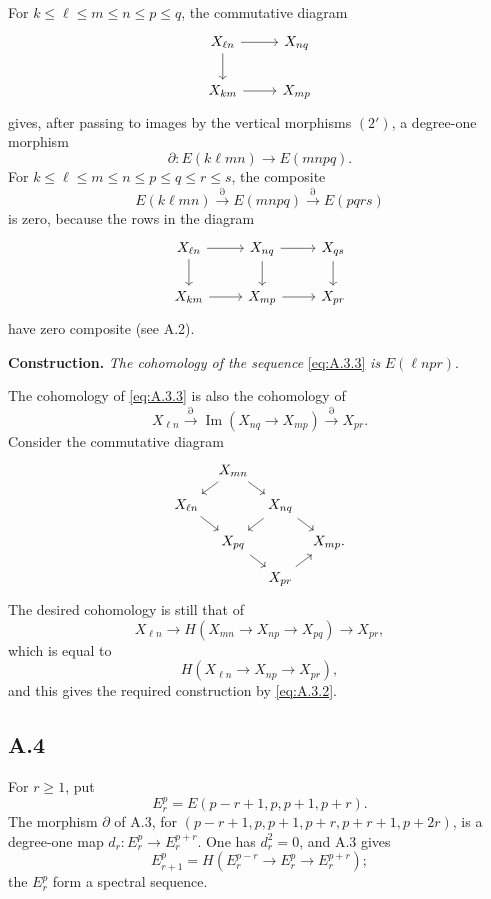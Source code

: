 \documentclass[11pt,a4paper]{article}
\theoremstyle{plain}
\theoremstyle{definition}
\theoremstyle{remark}
\begin{document}
For $k\leqslant \ell\leqslant m\leqslant n\leqslant p\leqslant q$, the commutative diagram
\[
\begin{tikzcd}
X_{\ell n} \arrow[r] \arrow[d] & X_{nq} \\
X_{km} \arrow[r] & X_{mp}
\end{tikzcd}
\]
gives, after passing to images by the vertical morphisms $(2')$, a degree-one morphism
\[
\partial\colon E(k\ell mn)\to E(mnpq).
\]
For $k\leqslant\ell\leqslant m\leqslant n\leqslant p\leqslant q\leqslant r\leqslant s$, the composite
\begin{equation}\label{eq:A.3.3}
E(k\ell mn)\xrightarrow{\partial}E(mnpq)\xrightarrow{\partial}E(pqrs)
\end{equation}
is zero, because the rows in the diagram
\[
\begin{tikzcd}
X_{\ell n} \arrow[r] \arrow[d] & X_{nq} \arrow[r] \arrow[d] & X_{qs} \arrow[d] \\
X_{km} \arrow[r] & X_{mp} \arrow[r] & X_{pr}
\end{tikzcd}
\]
have zero composite (see A.2).

\medskip
\noindent\textbf{Construction.} \emph{The cohomology of the sequence} \eqref{eq:A.3.3} \emph{is} $E(\ell npr)$.

The cohomology of \eqref{eq:A.3.3} is also the cohomology of
\[
X_{\ell n}\xrightarrow{\partial}\operatorname{Im}(X_{nq}\to X_{mp})\xrightarrow{\partial}X_{pr}.
\]
Consider the commutative diagram
\[
\begin{tikzcd}[column sep=tiny,row sep=small]
& X_{mn} \arrow[rd] \arrow[ld] \\
X_{\ell n} \arrow[rd] & & X_{nq} \arrow[ld] \arrow[rd] \\
& X_{pq} \arrow[rd] & & X_{mp}. \\
& & X_{pr} \arrow[ru]
\end{tikzcd}
\]
The desired cohomology is still that of
\[
X_{\ell n}\to H(X_{mn}\to X_{np}\to X_{pq})\to X_{pr},
\]
which is equal to
\[
H(X_{\ell n}\to X_{np}\to X_{pr}),
\]
and this gives the required construction by \eqref{eq:A.3.2}.

\subsection*{A.4}
For $r\geqslant1$, put
\[
E_r^p=E(p-r+1,p,p+1,p+r).
\]
The morphism $\partial$ of A.3, for $(p-r+1,p,p+1,p+r,p+r+1,p+2r)$, is a degree-one map $d_r\colon E_r^p\to E_r^{p+r}$. One has $d_r^2=0$, and A.3 gives
\[
E_{r+1}^p=H(E_r^{p-r}\to E_r^p\to E_r^{p+r});
\]
the $E_r^p$ form a spectral sequence.
\end{document}

